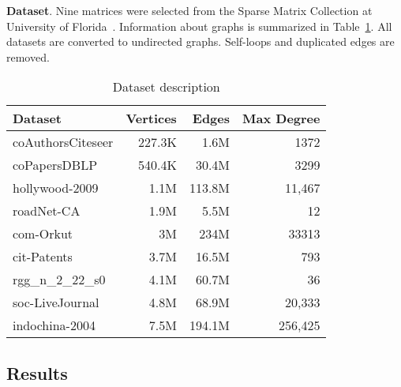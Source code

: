 \textbf{Dataset}. Nine matrices were selected from the Sparse Matrix Collection at University of Florida~\cite{dataset:sparse_matrix_collection}. Information about graphs is summarized in Table~\ref{dataset:info}. All datasets are converted to undirected graphs. Self-loops and duplicated edges are removed.\\

\begin{table}[tbp]
\caption{Dataset description} 
\begin{center}
    \begin{tabular}{|l|r|r|r|}
    \hline
    Dataset & Vertices  & Edges & Max Degree \\
    \hline
    \hline
    coAuthorsCiteseer & 227.3K &   1.6M &    1372 \\
    coPapersDBLP      & 540.4K &  30.4M &    3299 \\
    hollywood-2009    &   1.1M & 113.8M &  11,467 \\
    roadNet-CA        &   1.9M &   5.5M &      12 \\
    com-Orkut         &     3M &   234M &   33313 \\
    cit-Patents       &   3.7M &  16.5M &     793 \\
    rgg\_n\_2\_22\_s0 &   4.1M &  60.7M &      36 \\
    soc-LiveJournal   &   4.8M &  68.9M &  20,333 \\
    indochina-2004    &   7.5M & 194.1M & 256,425 \\
    \hline
    \end{tabular}
    \label{dataset:info}
\end{center}
\end{table}

\subsection{Results}

